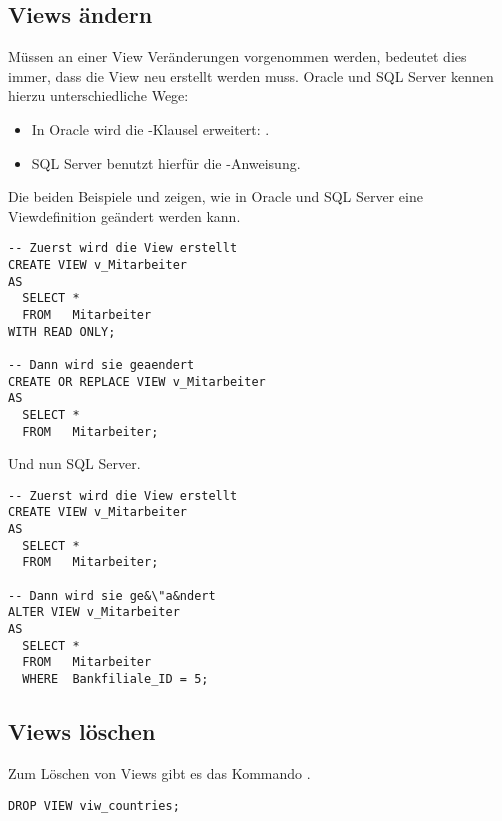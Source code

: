       \subsection{Views \"andern}
        \label{alterview}
        M\"ussen an einer View Ver\"anderungen vorgenommen werden, bedeutet dies immer, dass die View neu erstellt werden muss. Oracle und SQL Server kennen hierzu unterschiedliche Wege:
        \begin{itemize}
          \item In Oracle wird die -Klausel erweitert: .
          \item SQL Server benutzt hierf\"ur die -Anweisung.
        \end{itemize}
        Die beiden Beispiele  und  zeigen, wie in Oracle und SQL Server eine Viewdefinition ge\"andert werden kann.
        \begin{lstlisting}[language=oracle_sql,caption={Eine View \"andern in Oracle},label=sql08_40]
-- Zuerst wird die View erstellt
CREATE VIEW v_Mitarbeiter
AS
  SELECT *
  FROM   Mitarbeiter
WITH READ ONLY;

-- Dann wird sie geaendert
CREATE OR REPLACE VIEW v_Mitarbeiter
AS
  SELECT *
  FROM   Mitarbeiter;
        \end{lstlisting}
\clearpage
        Und nun SQL Server.
        \begin{lstlisting}[language=ms_sql,caption={Eine View \"andern in SQL
Server},label=sql08_41]
-- Zuerst wird die View erstellt
CREATE VIEW v_Mitarbeiter
AS
  SELECT *
  FROM   Mitarbeiter;

-- Dann wird sie ge&\"a&ndert
ALTER VIEW v_Mitarbeiter
AS
  SELECT *
  FROM   Mitarbeiter
  WHERE  Bankfiliale_ID = 5;
        \end{lstlisting}
      \subsection{Views l\"oschen}
        Zum L\"oschen von Views gibt es das Kommando .
        \begin{lstlisting}[language=ms_sql,caption={Eine View l\"oschen},label=sql08_42]
DROP VIEW viw_countries;
        \end{lstlisting}
